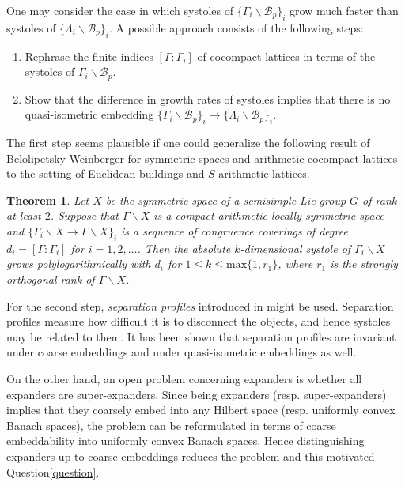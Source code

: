 \documentclass[letterpaper, reqno, 11pt]{amsart}
\newtheorem{theorem}{Theorem}[section]
\theoremstyle{definition}
\theoremstyle{definition}
\theoremstyle{remark}
\begin{document}
One may consider the case in which systoles of 
$\{\Gamma_i \backslash \mathcal{B}_p\}_i$ grow much faster than 
systoles of $\{\Lambda_i \backslash \mathcal{B}_p\}_i$. 
A possible approach consists of the following steps:
\begin{enumerate}
    \item Rephrase the finite indices $[\Gamma: \Gamma_i]$ of cocompact lattices in terms of the systoles of $\Gamma_i \backslash \mathcal{B}_p$. 
    

    \item Show that the difference in growth rates of systoles implies that there is no quasi-isometric embedding $\{\Gamma_i \backslash \mathcal{B}_p\}_i \to \{\Lambda_i \backslash \mathcal{B}_p\}_i$.
\end{enumerate}


The first step seems plausible if one could generalize 
the following result of Belolipetsky-Weinberger for symmetric spaces and arithmetic cocompact lattices to the setting of Euclidean buildings and $S$-arithmetic lattices.

\begin{theorem} \textup{\cite{belolipetsky2024growth}} \label{bw}
Let $X$ be the symmetric space of a semisimple Lie group $G$ of rank at least $2$. Suppose that $\Gamma \backslash X$ is a compact arithmetic locally symmetric space and 
$\{\Gamma_i \backslash X \to \Gamma \backslash X\}_i$ is a sequence of congruence coverings of degree $d_i=[\Gamma: \Gamma_i]$ for $i=1,2, \dots$. Then the absolute $k$-dimensional systole of $\Gamma_i \backslash X$ grows polylogarithmically with $d_i$ for 
$1 \leq k \leq \text{max} \{1, r_1\}$, where $r_1$ is the strongly orthogonal rank of $\Gamma \backslash X$.
     
\end{theorem}



For the second step, \textit{separation profiles} introduced in \cite{benjamini2012separation} might be used. Separation profiles measure how difficult it is to disconnect the objects, and hence systoles may be related to them.
It has been shown that separation profiles are invariant under coarse embeddings and under quasi-isometric embeddings as well.



\bigskip

On the other hand, an open problem concerning expanders is whether all expanders are super-expanders. 
Since being expanders (resp. super-expanders) implies that they coarsely embed into any Hilbert space (resp. uniformly convex Banach spaces), 
the problem can be reformulated in terms of coarse embeddability into uniformly convex Banach spaces.
Hence distinguishing expanders up to coarse embeddings reduces the problem and this motivated Question\ref{question}.
\end{document}
